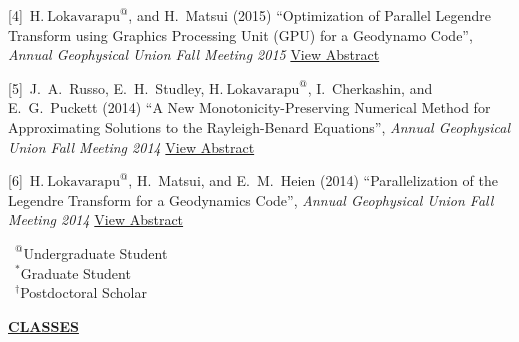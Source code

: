 \documentclass[11pt]{ltxdoc}
\begin{document}
\hangindent 20pt
[4]~$\mathrm{H.~Lokavarapu}^{@}$, and H.~Matsui (2015) 
``Optimization of Parallel Legendre Transform using Graphics Processing Unit (GPU) for a Geodynamo Code'', 
\textit{Annual Geophysical Union Fall Meeting 2015}
\href{http://adsabs.harvard.edu/abs/2015AGUFMGP43B1253L}{View Abstract}

\hangindent 20pt
[5]~J.~A.~Russo, E.~H.~Studley, $\mathrm{H.~Lokavarapu}^{@}$, I.~Cherkashin, and E.~G.~Puckett (2014) 
``A New Monotonicity-Preserving Numerical Method for Approximating Solutions to the Rayleigh-Benard Equations'', 
\textit{Annual Geophysical Union Fall Meeting 2014}
\href{http://adsabs.harvard.edu/abs/2014AGUFMDI11A4258R}{View Abstract}

\hangindent 20pt
[6]~$\mathrm{H.~Lokavarapu}^{@}$, H.~Matsui, and E.~M.~Heien (2014) 
``Parallelization of the Legendre Transform for a Geodynamics Code'', 
\textit{Annual Geophysical Union Fall Meeting 2014}
\href{http://adsabs.harvard.edu/abs/2014AGUFMDI11A4255L}{View Abstract}

\vskip 18pt

$\phantom{0}^@$Undergraduate Student        \\
$\phantom{0}^*$Graduate Student             \\
$\phantom{0}^{\dagger}$Postdoctoral Scholar

\begin{center}
  \textbf{\underline{CLASSES}}
\end{center}

\vskip -6pt
\end{document}

